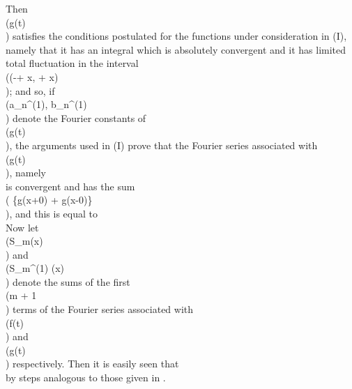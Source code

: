 Then \\(g(t)\\) satisfies the conditions postulated for the functions under
consideration in (I),%
namely that it has an integral which is
absolutely convergent and it has limited total fluctuation in the
interval \\((-\pi + x, \pi + x)\\); and so, if
\\(a_{n}^{(1)}, b_{n}^{(1)}\\) denote the Fourier
constants of \\(g(t)\\), the arguments used in (I) %
prove that the Fourier
series associated with \\(g(t)\\), namely
\\[ 
\frac{1}{2} a_{0}^{(1)}
+
\sum_{n=1}^{\infty}
\left(
  a_{n}^{(1)} \cos nx
  +
  b_{n}^{(1)} \sin nx
\right),
\\] 
is convergent and has the sum
\\( \left\{g(x+0) + g(x-0)\right\}\\), and this is
equal to
\\[ 
\frac{1}{2} \left\{
  f(x+0) + f(x-0)
\right\}.
\\] 
%
%

Now let \\(S_{m}(x)\\) and \\(S_{m}^{(1)} (x)\\) denote the sums of the first \\(m + 1\\)
terms of the Fourier series associated with \\(f(t)\\) and \\(g(t)\\) respectively. Then
it is easily seen that
\\[ \begin{align*}
  S_{m}(x)
  =&
  \frac{1}{\pi}
  \! \int_{-\pi}^{\pi}\! \left\{
    \frac{1}{2}
    + \cos (x-t)
    + \cos 2(x-t)
    + \cdots
    + \cos m(x-t)
  \right\}
  f(t) \, d t
  \\
  =&
  \frac{1}{2\pi}
  \! \int_{-\pi}^{\pi}\!
  \frac{\sin (m+\frac{1}{2}) (x-t) }{\sin \frac{1}{2} (x-t)}
  f(t) \, d t
  \\
  =&
  \frac{1}{2\pi}
  \! \int_{-\pi+x}^{\pi+x}\!
  \frac{\sin (m+\frac{1}{2}) (x-t) }{\sin \frac{1}{2} (x-t)}
  f(t) \, d t
  \\
  =&
  \frac{1}{\pi}
  \! \int_{0}^{\frac{1}{2} \pi}\!
  \frac{\sin (2m+1)\theta}{\sin \theta}
  f(x + 2\theta) \, d \theta
  +
  \frac{1}{\pi}
  \! \int_{0}^{\frac{1}{2} \pi}\!
  \frac{\sin (2m+1)\theta}{\sin \theta}
  f(x - 2\theta) \, d \theta,
\end{align*} \\]
by steps analogous to those given in .

